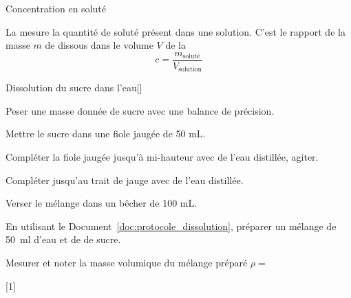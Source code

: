 \begin{doc}{Concentration en soluté}
  \begin{importants}
    La  mesure la quantité de soluté présent dans une solution.
    C'est le rapport de la masse $m$ de  dissous dans le volume $V$ de la 
    \begin{equation*}
      c = \frac{m_\text{soluté}}{V_\text{solution}}
    \end{equation*} 
  \end{importants}
\end{doc}


\begin{doc}{Dissolution du sucre dans l'eau}[\label{doc:protocole_dissolution}]
  \begin{protocole}
      \item Peser une masse donnée de sucre avec une balance de précision.
      \item Mettre le sucre dans une fiole jaugée de 50 mL.
      \item Compléter la fiole jaugée jusqu'à mi-hauteur avec de l'eau distillée, agiter.
      \item Compléter jusqu'au trait de jauge avec de l'eau distillée.
      \item Verser le mélange dans un bêcher de 100 mL.
  \end{protocole}
\end{doc}


\newpage
\vspace*{-28pt}

\mesure
En utilisant le Document~\ref{doc:protocole_dissolution}, préparer un mélange de \qty{50}{\ml} d'eau et de de sucre.

\mesure
Mesurer et noter la masse volumique du mélange préparé $\rho =$ 

[1]


